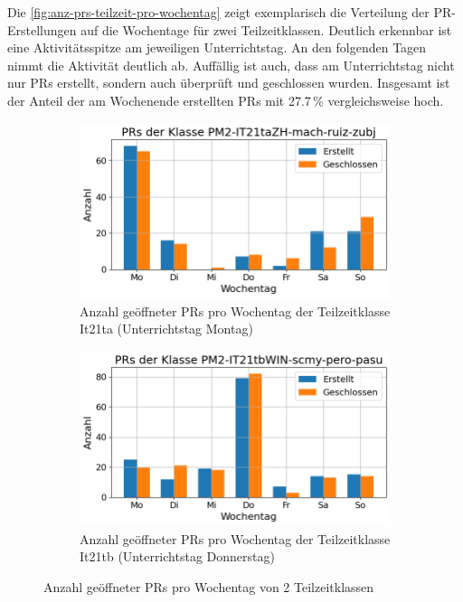 Die \autoref{fig:anz-prs-teilzeit-pro-wochentag} zeigt exemplarisch die Verteilung der PR-Erstellungen auf die Wochentage für zwei Teilzeitklassen. Deutlich erkennbar ist eine Aktivitätsspitze am jeweiligen Unterrichtstag. An den folgenden Tagen nimmt die Aktivität deutlich ab. Auffällig ist auch, dass am Unterrichtstag nicht nur PRs erstellt, sondern auch überprüft und geschlossen wurden. Insgesamt ist der Anteil der am Wochenende erstellten PRs mit 27.7\,\% vergleichsweise hoch.

\begin{figure}[htbp]
    \centering
    \begin{subfigure}[b]{0.48\textwidth}
        \centering
        \includegraphics[width=\textwidth]{Figures/pr-klasse-per-wochentag-it21ta.png}
         \caption{Anzahl geöffneter PRs pro Wochentag der Teilzeitklasse It21ta (Unterrichtstag Montag)}
        \label{fig:anzahl-prs-pro-wochentag-it21ta}
    \end{subfigure}
    \hfill
    \begin{subfigure}[b]{0.48\textwidth}
        \centering
        \includegraphics[width=\textwidth]{Figures/pr-klasse-per-wochentag-21tb.png}
         \caption{Anzahl geöffneter PRs pro Wochentag der Teilzeitklasse It21tb (Unterrichtstag Donnerstag)}
        \label{fig:anzahl-prs-pro-wochentag-it21tb}
    \end{subfigure}
    \caption{Anzahl geöffneter PRs pro Wochentag von 2 Teilzeitklassen}
    \label{fig:anz-prs-teilzeit-pro-wochentag}
\end{figure}

